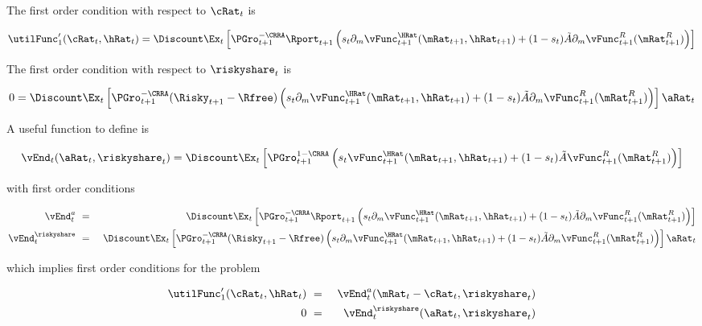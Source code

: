 \documentclass[PortfolioChoiceWithRiskyHousing]{subfiles}
\begin{document}
The first order condition with respect to $\cRat_{t}$ is

\begin{equation}
	\utilFunc_{1}'(\cRat_{t}, \hRat_{t}) = \Discount \Ex_{t} \left[ \PGro^{-\CRRA}_{t+1} \Rport_{t+1} \left(s_{t} \partial_m \vFunc^{\HRat}_{t+1}(\mRat_{t+1}, \hRat_{t+1}) + (1-s_{t}) \tilde{A} \partial_m \vFunc_{t+1}^R(\mRat^R_{t+1}) \right) \right]
\end{equation}

The first order condition with respect to $\riskyshare_{t}$ is

\begin{equation}
	0 = \Discount \Ex_{t} \left[ \PGro^{-\CRRA}_{t+1} (\Risky_{t+1} - \Rfree) \left(s_{t} \partial_m \vFunc^{\HRat}_{t+1}(\mRat_{t+1}, \hRat_{t+1}) + (1-s_{t}) \tilde{A} \partial_m \vFunc_{t+1}^R(\mRat^R_{t+1}) \right) \right] \aRat_{t}
\end{equation}

A useful function to define is

\begin{equation}
	\vEnd_{t}(\aRat_{t}, \riskyshare_{t}) = \Discount\Ex_{t} \left[ \PGro_{t+1}^{1-\CRRA} \left(s_{t} \vFunc^{\HRat}_{t+1}(\mRat_{t+1}, \hRat_{t+1}) + (1-s_{t}) \tilde{A} \vFunc^R_{t+1}(\mRat^R_{t+1})\right)\right]
\end{equation}

with first order conditions

\begin{eqnarray}
	\vEnd_{t}^a &~ = &~ \Discount \Ex_{t} \left[ \PGro_{t+1}^{-\CRRA} \Rport_{t+1} \left(s_{t} \partial_m \vFunc^{\HRat}_{t+1}(\mRat_{t+1}, \hRat_{t+1}) + (1-s_{t}) \tilde{A} \partial_m \vFunc_{t+1}^R(\mRat^R_{t+1}) \right) \right] \\
	\vEnd_{t}^\riskyshare &~ = &~ \Discount \Ex_{t} \left[ \PGro_{t+1}^{-\CRRA} (\Risky_{t+1}-\Rfree) \left(s_{t} \partial_m \vFunc^{\HRat}_{t+1}(\mRat_{t+1}, \hRat_{t+1}) + (1-s_{t}) \tilde{A} \partial_m \vFunc_{t+1}^R(\mRat^R_{t+1}) \right) \right]\aRat_{t}
\end{eqnarray}

which implies first order conditions for the problem

\begin{eqnarray}
	\utilFunc_{1}'(\cRat_{t}, \hRat_{t}) &~ = &~ \vEnd_{t}^a(\mRat_{t}-\cRat_{t},\riskyshare_{t}) \\
	0 &~ = &~ \vEnd_{t}^\riskyshare(\aRat_{t}, \riskyshare_{t})
\end{eqnarray}
\end{document}
